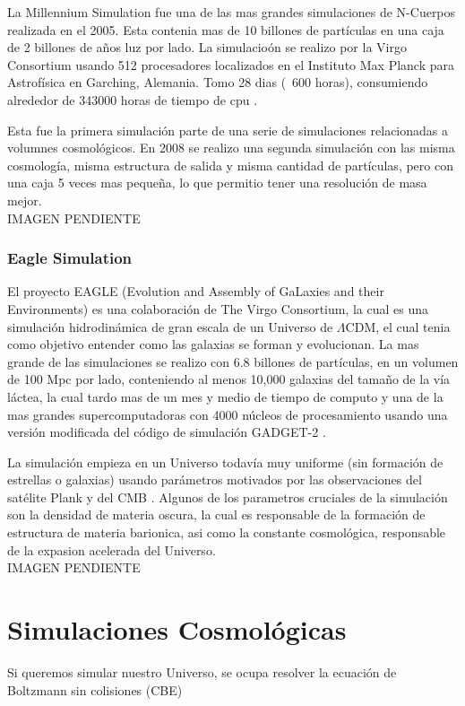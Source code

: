La Millennium Simulation fue una de las mas grandes simulaciones de N-Cuerpos realizada en el 2005. Esta contenia mas de 10 billones de partículas en una caja de 2 billones de años luz por lado. La simulacioón se realizo por la Virgo Consortium usando 512 procesadores localizados en el Instituto Max Planck para Astrofísica en Garching, Alemania. Tomo 28 dias (~600 horas), consumiendo alrededor  de  343000 horas de tiempo de cpu \cite{2005Natur.435..629S}.

Esta fue la primera simulación parte de una serie de simulaciones relacionadas a volumnes cosmológicos. En 2008 se realizo una segunda simulación con las misma cosmología, misma estructura de salida y misma cantidad de partículas, pero con una caja 5 veces mas pequeña, lo que permitio tener una resolución de masa mejor.
\\

{\LARGE
IMAGEN PENDIENTE
}


\subsubsection{Eagle Simulation}
El proyecto EAGLE (Evolution and Assembly of GaLaxies and their Environments)  es una colaboración de The Virgo Consortium, la cual es una simulación hidrodinámica de gran escala de un Universo de $\Lambda$CDM, el cual tenia como objetivo entender como las galaxias se forman y evolucionan. La mas grande de las simulaciones se realizo con  6.8 billones de partículas, en un volumen de 100 Mpc por lado, conteniendo al menos 10,000 galaxias del tamaño de la vía láctea, la cual tardo mas de un mes y medio de tiempo de computo y una de la mas grandes supercomputadoras con 4000 núcleos de procesamiento usando una versión modificada del código de simulación GADGET-2 \cite{2015MNRAS.450.1937C, 2015MNRAS.446..521S}.

La simulación empieza en un Universo todavía muy uniforme (sin formación de estrellas o galaxias) usando parámetros motivados por las observaciones del satélite Plank y del CMB \cite{ 2013ApJS..208...20B, 2020A&A...641A...1P}. Algunos de los parametros cruciales de la simulación son la densidad de materia oscura, la cual es responsable de la formación de estructura de materia barionica, asi como la constante cosmológica, responsable de la expasion acelerada del Universo.
\\

{\LARGE
IMAGEN PENDIENTE
}
\section{Simulaciones Cosmológicas}
Si queremos simular nuestro Universo, se ocupa resolver la ecuación de Boltzmann sin colisiones (CBE)

